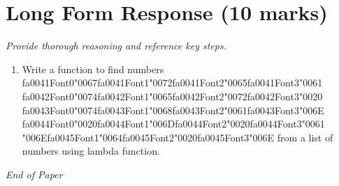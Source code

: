 \documentclass[12pt]{article}
\begin{document}
\section*{Long Form Response (10 marks)}
\textit{Provide thorough reasoning and reference key steps.}
\begin{enumerate}[label=\arabic*.]
\item Write a function to find numbers {\csname fa0041Font0\endcsname\char"0067}{\csname fa0041Font1\endcsname\char"0072}{\csname fa0041Font2\endcsname\char"0065}{\csname fa0041Font3\endcsname\char"0061} {\csname fa0042Font0\endcsname\char"0074}{\csname fa0042Font1\endcsname\char"0065}{\csname fa0042Font2\endcsname\char"0072}{\csname fa0042Font3\endcsname\char"0020} {\csname fa0043Font0\endcsname\char"0074}{\csname fa0043Font1\endcsname\char"0068}{\csname fa0043Font2\endcsname\char"0061}{\csname fa0043Font3\endcsname\char"006E} {\csname fa0044Font0\endcsname\char"0020}{\csname fa0044Font1\endcsname\char"006D}{\csname fa0044Font2\endcsname\char"0020}{\csname fa0044Font3\endcsname\char"0061} {\char"006E}{\csname fa0045Font1\endcsname\char"0064}{\csname fa0045Font2\endcsname\char"0020}{\csname fa0045Font3\endcsname\char"006E} from a list of numbers using lambda
function.
\end{enumerate}

\vfill
\noindent\textit{End of Paper}
\end{document}
